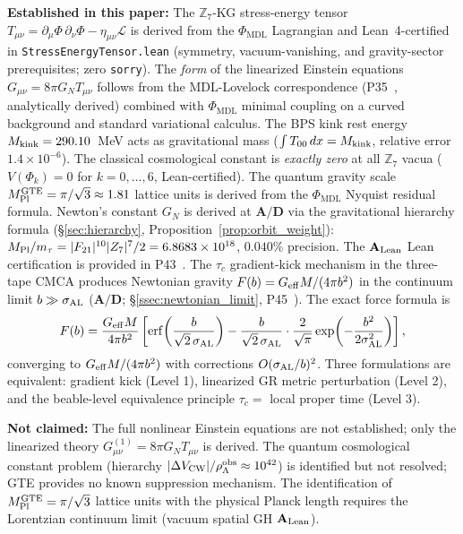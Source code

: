 \documentclass[11pt]{article}
\theoremstyle{remark}
\newcommand{\GTE}{\text{GTE}}
\newcommand{\PHIMDL}{\Phi_{\mathrm{MDL}}}
\newcommand{\ZS}{\mathbb{Z}_7}
\newcommand{\lean}[1]{%
  \penalty-100
  \begingroup\def\_{\textunderscore\allowbreak}\texttt{#1}\endgroup}
\newcommand{\Mkink}{M_{\rm kink}}
\newcommand{\CatAL}{\ensuremath{\textbf{A}_{\rm Lean}}}
\newcommand{\CatAD}{\textbf{A/D}}
\newcommand{\Tmunu}{T_{\mu\nu}}
\newcommand{\Gmunu}{G_{\mu\nu}}
\newcommand{\GN}{G_N}
\newcommand{\MPl}{M_{\rm Pl}}
\newcommand{\MPltot}{M_{\rm Pl}^{\GTE}}
\newcommand{\rhoLam}{\rho_\Lambda}
\begin{document}
\begin{tcolorbox}[colback=orange!4,colframe=orange!55!black,
  title={\textbf{What this paper does and does not claim}},
  fonttitle=\bfseries,left=6pt,right=6pt,top=5pt,bottom=5pt]
\small
\textbf{Established in this paper:}
The $\ZS$-KG stress-energy tensor $\Tmunu = \partial_\mu\Phi\,\partial_\nu\Phi -
\eta_{\mu\nu}\mathcal{L}$ is derived from the $\PHIMDL$ Lagrangian and
Lean~4-certified in \lean{StressEnergyTensor.lean} (symmetry, vacuum-vanishing,
and gravity-sector prerequisites; zero \texttt{sorry}).
The \emph{form} of the linearized Einstein equations
$\Gmunu = 8\pi\GN\Tmunu$ follows from the MDL-Lovelock correspondence
(P35~\cite{SpivackGTEUnification}, analytically derived) combined with
$\PHIMDL$ minimal coupling on a curved background and standard variational
calculus.
The BPS kink rest energy $\Mkink = 290.10$~MeV acts as gravitational mass
($\int T_{00}\,dx = \Mkink$, relative error $1.4\times10^{-6}$).
The classical cosmological constant is \emph{exactly zero} at all $\ZS$ vacua
($V(\Phi_k)=0$ for $k=0,\ldots,6$, Lean-certified).
The quantum gravity scale $\MPltot = \pi/\sqrt{3} \approx 1.81$ lattice units is
derived from the $\PHIMDL$ Nyquist residual formula.
Newton's constant $\GN$ is derived at $\CatAD$ via the gravitational hierarchy
formula (\S\ref{sec:hierarchy}, Proposition~\ref{prop:orbit_weight}):
$\MPl/m_\tau = |F_{21}|^{10}|Z_7|^7/2 = 6.8683\times10^{18}$, $0.040\%$ precision.
The $\CatAL$ Lean certification is provided in P43~\cite{SpivackCompleteness}.
The $\tau_c$ gradient-kick mechanism in the three-tape CMCA produces Newtonian gravity
$F(b) = G_{\rm eff}M/(4\pi b^2)$ in the continuum limit $b \gg \sigma_{\rm AL}$
($\CatAD$; \S\ref{ssec:newtonian_limit}, P45~\cite{SpivackCMCA}).
The exact force formula is
\[
  F(b) = \frac{G_{\rm eff}M}{4\pi b^2}
  \left[\mathrm{erf}\!\left(\frac{b}{\sqrt{2}\,\sigma_{\rm AL}}\right)
  - \frac{b}{\sqrt{2}\,\sigma_{\rm AL}}\cdot\frac{2}{\sqrt{\pi}}
    \exp\!\left(-\frac{b^2}{2\sigma_{\rm AL}^2}\right)\right],
\]
converging to $G_{\rm eff}M/(4\pi b^2)$ with corrections $O(\sigma_{\rm AL}/b)^2$.
Three formulations are equivalent: gradient kick (Level 1), linearized GR metric perturbation
(Level 2), and the beable-level equivalence principle $\tau_c = $ local proper time (Level 3).

\textbf{Not claimed:}
The full nonlinear Einstein equations are not established; only the linearized
theory $\Gmunu^{(1)} = 8\pi\GN\Tmunu$ is derived.
The quantum cosmological constant problem (hierarchy $|\Delta V_{\rm CW}|/\rhoLam^{\rm obs}
\approx 10^{42}$) is identified but not resolved; GTE provides no known suppression mechanism.
The identification of $\MPltot = \pi/\sqrt{3}$ lattice units with the physical Planck length
requires the Lorentzian continuum limit (vacuum spatial GH \CatAL).
\end{tcolorbox}
\end{document}
